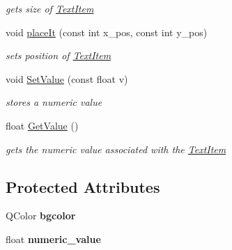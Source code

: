 \begin{DoxyCompactItemize}
\begin{DoxyCompactList}\small\item\em gets size of \hyperlink{class_text_item}{Text\+Item} \end{DoxyCompactList}\item 
void \hyperlink{class_text_item_ac0971ebbb2d234e7da58acbf11ba4a60}{place\+It} (const int x\+\_\+pos, const int y\+\_\+pos)
\begin{DoxyCompactList}\small\item\em sets position of \hyperlink{class_text_item}{Text\+Item} \end{DoxyCompactList}\item 
void \hyperlink{class_text_item_a785f645633f00591d7a33d7f54f72705}{Set\+Value} (const float v)
\begin{DoxyCompactList}\small\item\em stores a numeric value \end{DoxyCompactList}\item 
float \hyperlink{class_text_item_ad1824d69e26bd8d7414c1ab6f9a7ed12}{Get\+Value} ()
\begin{DoxyCompactList}\small\item\em gets the numeric value associated with the \hyperlink{class_text_item}{Text\+Item} \end{DoxyCompactList}\end{DoxyCompactItemize}
\subsection*{Protected Attributes}
\begin{DoxyCompactItemize}
\item 
Q\+Color {\bfseries bgcolor}\hypertarget{class_text_item_ad04d01ec588c0c9afa52719cd57cee9e}{}\label{class_text_item_ad04d01ec588c0c9afa52719cd57cee9e}

\item 
float {\bfseries numeric\+\_\+value}\hypertarget{class_text_item_a2310d84d779d095293e504e5c6e2d5ee}{}\label{class_text_item_a2310d84d779d095293e504e5c6e2d5ee}

\end{DoxyCompactItemize}
